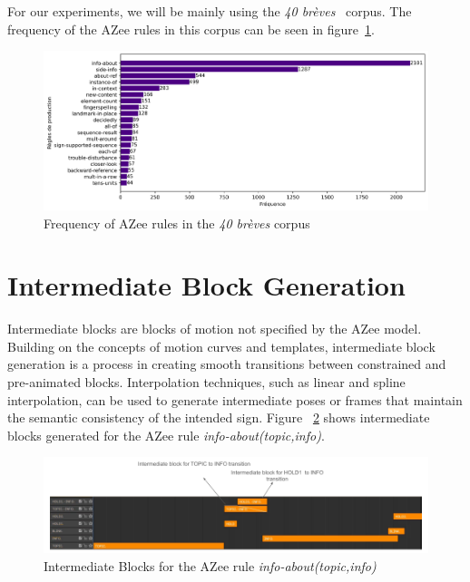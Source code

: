 \documentclass[../../main.tex]{subfiles}
\begin{document}
For our experiments, we will be mainly using the \emph{40 brèves}~\cite{challant2022first} corpus. The frequency of the AZee rules in this corpus can be seen in figure~\ref{fig:azee_rule_frequency}.

\begin{figure}
    \centering \includegraphics[width = 5in]{chapters/intermediate_blocks/images/azee_rule_frequency.png}
    \caption{Frequency of AZee rules in the \emph{40 brèves} corpus}
    \label{fig:azee_rule_frequency}
\end{figure}

\section{Intermediate Block Generation}
\label{ch:intermediate_blocks:intermediate_block_generation}

Intermediate blocks are blocks of motion not specified by the AZee model. Building on the concepts of motion curves and templates, intermediate block generation is a process in creating smooth transitions between constrained and pre-animated blocks. Interpolation techniques, such as linear and spline interpolation, can be used to generate intermediate poses or frames that maintain the semantic consistency of the intended sign. Figure ~\ref{fig:info_about_intermediate_example} shows intermediate blocks generated for the AZee rule \emph{info-about(topic,info)}.

\begin{figure}
    \centering \includegraphics[width = 5in]{chapters/intermediate_blocks/images/info_about_intermediate_example.png}
    \caption{Intermediate Blocks for the AZee rule \emph{info-about(topic,info)}}
    \label{fig:info_about_intermediate_example}
\end{figure}
\end{document}
